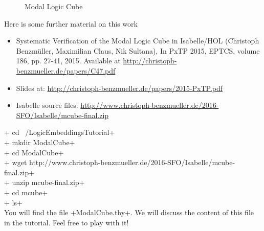 \documentclass{article}
\begin{document}
\begin{figure}[t]
\caption{Modal Logic Cube} \label{cube}
\end{figure}

Here is some further material on this work
\begin{itemize}
\item Systematic Verification of the Modal Logic Cube in Isabelle/HOL
  (Christoph Benzm\"uller, Maximilian Claus, Nik Sultana), In PxTP 2015, EPTCS, volume 186,
  pp. 27-41, 2015. Available at
  \href{http://christoph-benzmueller.de/papers/C47.pdf}{http://christoph-benzmueller.de/papers/C47.pdf}
\item Slides at:  \href{http://christoph-benzmueller.de/papers/2015-PxTP.pdf}{http://christoph-benzmueller.de/papers/2015-PxTP.pdf}
\item Isabelle source files: 
\href{http://www.christoph-benzmueller.de/2016-SFO/Isabelle/mcube-final.zip}{http://www.christoph-benzmueller.de/2016-SFO/Isabelle/mcube-final.zip} 
\end{itemize}
+ cd ~/LogicEmbeddingsTutorial+\\
+ mkdir ModalCube+ \\
+ cd ModalCube+ \\
+ wget http://www.christoph-benzmueller.de/2016-SFO/Isabelle/mcube-final.zip+ \\
+ unzip mcube-final.zip+ \\
+ cd mcube+ \\
+ ls+ \\[1em]
You will find the file +ModalCube.thy+. We will discuss the content of
this file in the tutorial. Feel free to play with it!
\end{document}
